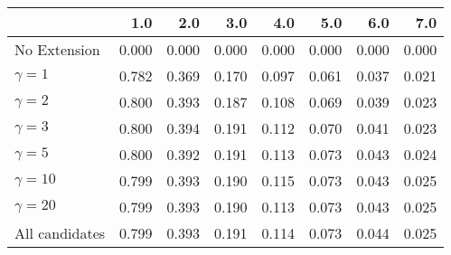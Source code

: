 \begin{tabular}{lrrrrrrr}
\toprule
{} &   1.0 &   2.0 &   3.0 &   4.0 &   5.0 &   6.0 &   7.0 \\
\midrule
No Extension   & 0.000 & 0.000 & 0.000 & 0.000 & 0.000 & 0.000 & 0.000 \\
$\gamma = 1$   & 0.782 & 0.369 & 0.170 & 0.097 & 0.061 & 0.037 & 0.021 \\
$\gamma = 2$   & 0.800 & 0.393 & 0.187 & 0.108 & 0.069 & 0.039 & 0.023 \\
$\gamma = 3$   & 0.800 & 0.394 & 0.191 & 0.112 & 0.070 & 0.041 & 0.023 \\
$\gamma = 5$   & 0.800 & 0.392 & 0.191 & 0.113 & 0.073 & 0.043 & 0.024 \\
$\gamma = 10$  & 0.799 & 0.393 & 0.190 & 0.115 & 0.073 & 0.043 & 0.025 \\
$\gamma = 20$  & 0.799 & 0.393 & 0.190 & 0.113 & 0.073 & 0.043 & 0.025 \\
All candidates & 0.799 & 0.393 & 0.191 & 0.114 & 0.073 & 0.044 & 0.025 \\
\bottomrule
\end{tabular}
